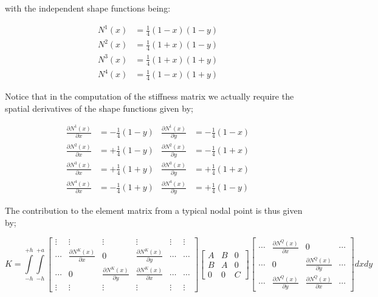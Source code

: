 with the independent shape functions being:


\begin{align*}
{N^1}(x) & = \frac{1}{4}(1 - x)(1 - y) \\
{N^2}(x) & = \frac{1}{4}(1 + x)(1 - y) \\
{N^3}(x) & = \frac{1}{4}(1 + x)(1 + y) \\
{N^4}(x) & = \frac{1}{4}(1 - x)(1 + y)
\end{align*}




Notice that in the computation of the stiffness matrix we actually require the spatial derivatives of the shape functions given by;

\begin{align*}
\frac{{\partial {N^1}(x)}}{{\partial x}} & =  - \frac{1}{4}(1 - y)           &  \frac{{\partial {N^1}(x)}}{{\partial y}} & =  - \frac{1}{4}(1 - x)\\
\frac{{\partial {N^2}(x)}}{{\partial x}} & =  + \frac{1}{4}(1 - y)           &  \frac{{\partial {N^2}(x)}}{{\partial y}} & =  - \frac{1}{4}(1 + x)\\
\frac{{\partial {N^3}(x)}}{{\partial x}} & =  + \frac{1}{4}(1 + y)           &  \frac{{\partial {N^3}(x)}}{{\partial y}} & =  + \frac{1}{4}(1 + x)\\
\frac{{\partial {N^4}(x)}}{{\partial x}} & =  - \frac{1}{4}(1 + y)           &  \frac{{\partial {N^4}(x)}}{{\partial y}} & =  + \frac{1}{4}(1 - y)
\end{align*}


The contribution to the element matrix from a typical nodal point is thus given by;



\[K = \int\limits_{ - h}^{ + h} {\int\limits_{ - h}^{ + a} {\begin{bmatrix}

 \vdots &  \vdots & \vdots &  \vdots & \vdots & \vdots \\
 \cdots &  \frac{{\partial {N^K}(x)}}{{\partial x}} & 0   & \frac{{\partial {N^K}(x)}}{{\partial y}} &  \cdots & \cdots \\
  \cdots &  0 & \frac{{\partial {N^K}(x)}}{{\partial y}}   & \frac{{\partial {N^K}(x)}}{{\partial x}} &  \cdots & \cdots \\
 \vdots &  \vdots & \vdots &  \vdots & \vdots & \vdots 

\end{bmatrix}
%
\begin{bmatrix}
 A & B &  0\\
 B & A & 0 \\
 0 &  0 & C
\end{bmatrix}
%
\begin{bmatrix}
 \cdots & \frac{{\partial {N^Q}(x)}}{{\partial x}} & 0  & \cdots \\
 \cdots & 0 & \frac{{\partial {N^Q}(x)}}{{\partial y}}  & \cdots \\
 \cdots & \frac{{\partial {N^Q}(x)}}{{\partial y}} & \frac{{\partial {N^Q}(x)}}{{\partial x}}  & \cdots 
\end{bmatrix} dxdy} } \]


